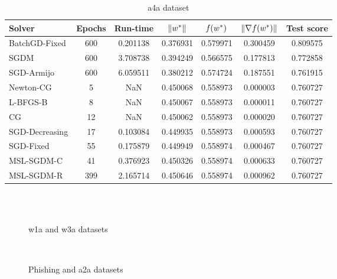 \begin{table}
\caption{a4a dataset}
\label{tab:a4a-tab}
\centering
\begin{tabular}{lS[drop-zero-decimal]S[round-precision=4]S[round-precision=6]S[round-precision=6]S[exponent-mode=scientific]S[round-precision=6]}
\toprule
Solver & {Epochs} & {Run-time} & {$\lVert w^\ast\rVert$} & {$\operatorname*{\mathit{f}}(w^\ast)$} & {$\lVert\nabla f(w^\ast)\rVert$} & {Test score} \\
\midrule
BatchGD-Fixed & 600 & 0.201138 & 0.376931 & 0.579971 & 0.300459 & 0.809575 \\
SGDM & 600 & 3.708738 & 0.394249 & 0.566575 & 0.177813 & 0.772858 \\
SGD-Armijo & 600 & 6.059511 & 0.380212 & 0.574724 & 0.187551 & 0.761915 \\
Newton-CG & 5 & NaN & 0.450068 & 0.558973 & 0.000003 & 0.760727 \\
L-BFGS-B & 8 & NaN & 0.450067 & 0.558973 & 0.000011 & 0.760727 \\
CG & 12 & NaN & 0.450062 & 0.558973 & 0.000020 & 0.760727 \\
SGD-Decreasing & 17 & 0.103084 & 0.449935 & 0.558973 & 0.000593 & 0.760727 \\
SGD-Fixed & 55 & 0.175879 & 0.449949 & 0.558974 & 0.000467 & 0.760727 \\
MSL-SGDM-C & 41 & 0.376923 & 0.450326 & 0.558974 & 0.000633 & 0.760727 \\
MSL-SGDM-R & 399 & 2.165714 & 0.450646 & 0.558974 & 0.000962 & 0.760727 \\
\bottomrule
\end{tabular}
\end{table}

\begin{figure}
\centering
 \\
 \\
\caption[]{w1a and w3a datasets}
\label{fig:w1a-w3a}
\end{figure}

\begin{figure}
\centering
 \\
\caption[]{Phishing and a2a datasets}
\label{fig:phish-a2a}
\end{figure}


